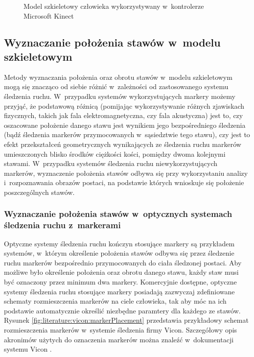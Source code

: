 \begin{savenotes}
	\begin{figure}[!htb]	
		\centering
		\scalebox{0.73}{													
			
		}
		\caption{Model szkieletowy człowieka wykorzystywany w~kontrolerze Microsoft Kinect}
		\label{fig:characteristics:kinect:skeleton}
	\end{figure}
\end{savenotes}		
													
\subsection{Wyznaczanie położenia stawów w~modelu szkieletowym}
Metody wyznaczania położenia oraz obrotu stawów w~modelu szkieletowym mogą się znacząco od siebie różnić w~zależności od zastosowanego systemu śledzenia ruchu. W~przypadku systemów wykorzystujących markery możemy przyjąć, że podstawową różnicą (pomijając wykorzystywanie różnych zjawiskach fizycznych, takich jak fala elektromagnetyczna, czy fala akustyczna) jest to, czy oszacowane położenie danego stawu jest wynikiem jego bezpośredniego śledzenia (bądź śledzenia markerów przymocowanych w~sąsiedztwie tego stawu), czy jest to efekt przekształceń geometrycznych wynikających ze śledzenia ruchu markerów umieszczonych blisko środków ciężkości kości, pomiędzy dwoma kolejnymi stawami. W~przypadku systemów śledzenia ruchu niewykorzystujących markerów, wyznaczenie położenia stawów odbywa się przy wykorzystaniu analizy i~rozpoznawania obrazów postaci, na podstawie których wnioskuje się położenie poszczególnych stawów.
																	
\subsubsection*{Wyznaczanie położenia stawów w~optycznych systemach śledzenia ruchu z~markerami}
Optyczne systemy śledzenia ruchu kończyn stosujące markery są przykładem systemów, w~którym określenie położenia stawów odbywa się przez śledzenie ruchu markerów bezpośrednio przymocowanych do ciała śledzonej postaci. Aby możliwe było określenie położenia oraz obrotu danego stawu, każdy staw musi być oznaczony przez minimum dwa markery. Komercyjnie dostępne, optyczne systemy śledzenia ruchu stosujące markery posiadają zazwyczaj zdefiniowane schematy rozmieszczenia markerów na ciele człowieka, tak aby móc na ich podstawie automatycznie określić niezbędne paramtery dla każdego ze stawów. Rysunek \ref{fig:literature:vicon:markerPlacement} przedstawia przykładowy schemat rozmieszczenia markerów w~systemie śledzenia firmy Vicon. Szczegółowy opis akronimów użytych do oznaczenia markerów można znaleźć w~dokumentacji systemu Vicon \cite{ViconGaitPlacement}.
																	
